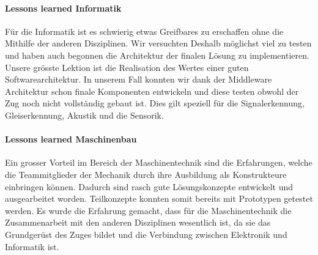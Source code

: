 \documentclass[../../main.tex]{subfiles}
\begin{document}
\paragraph{Lessons learned Informatik}
Für die Informatik ist es schwierig etwas Greifbares zu erschaffen ohne die Mithilfe der anderen Disziplinen. Wir
versuchten Deshalb möglichst viel zu testen und haben auch begonnen die Architektur der finalen Lösung zu
implementieren. Unsere grösste Lektion ist die Realisation des Wertes einer guten Softwarearchitektur. In unserem Fall konnten wir
dank der
Middleware Architektur schon finale Komponenten entwickeln und diese testen obwohl der Zug noch nicht vollständig gebaut
ist. Dies gilt speziell für die Signalerkennung, Gleiserkennung, Akustik und die Sensorik.

\paragraph{Lessons learned Maschinenbau}
Ein grosser Vorteil im Bereich der Maschinentechnik sind die Erfahrungen, welche die Teammitglieder der Mechanik durch ihre Ausbildung als Konstrukteure einbringen können. Dadurch sind rasch gute Lösungskonzepte entwickelt und ausgearbeitet worden. Teilkonzepte konnten somit bereits mit Prototypen getestet werden. Es wurde die Erfahrung gemacht, dass für die Maschinentechnik die Zusammenarbeit mit den anderen Disziplinen wesentlich ist, da sie das Grundgerüst des Zuges bildet und die Verbindung zwischen Elektronik und Informatik ist.
\end{document}
